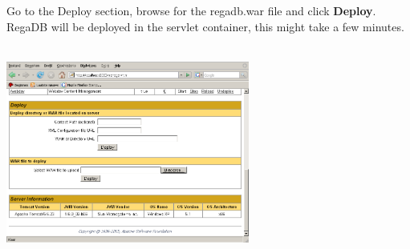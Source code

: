 Go to the Deploy section, browse for the regadb.war file and click \textbf{Deploy}. RegaDB will be deployed in the servlet container, this might take a few minutes.
\\
\vspace{0.5cm}~ \\ \centerline{\includegraphics[width=8cm] {pics/nsis/tomcat_page_manager_2.png}}
